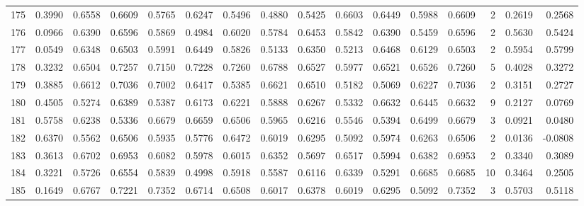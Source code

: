 \begin{tabular}{lrrrrrrrrrrrrrrr}
175 &      0.3990 &  0.6558 &  0.6609 &  0.5765 &  0.6247 &  0.5496 &  0.4880 &  0.5425 &  0.6603 &  0.6449 &   0.5988 &     0.6609 &      2 &                    0.2619 &                     0.2568 \\
176 &      0.0966 &  0.6390 &  0.6596 &  0.5869 &  0.4984 &  0.6020 &  0.5784 &  0.6453 &  0.5842 &  0.6390 &   0.5459 &     0.6596 &      2 &                    0.5630 &                     0.5424 \\
177 &      0.0549 &  0.6348 &  0.6503 &  0.5991 &  0.6449 &  0.5826 &  0.5133 &  0.6350 &  0.5213 &  0.6468 &   0.6129 &     0.6503 &      2 &                    0.5954 &                     0.5799 \\
178 &      0.3232 &  0.6504 &  0.7257 &  0.7150 &  0.7228 &  0.7260 &  0.6788 &  0.6527 &  0.5977 &  0.6521 &   0.6526 &     0.7260 &      5 &                    0.4028 &                     0.3272 \\
179 &      0.3885 &  0.6612 &  0.7036 &  0.7002 &  0.6417 &  0.5385 &  0.6621 &  0.6510 &  0.5182 &  0.5069 &   0.6227 &     0.7036 &      2 &                    0.3151 &                     0.2727 \\
180 &      0.4505 &  0.5274 &  0.6389 &  0.5387 &  0.6173 &  0.6221 &  0.5888 &  0.6267 &  0.5332 &  0.6632 &   0.6445 &     0.6632 &      9 &                    0.2127 &                     0.0769 \\
181 &      0.5758 &  0.6238 &  0.5336 &  0.6679 &  0.6659 &  0.6506 &  0.5965 &  0.6216 &  0.5546 &  0.5394 &   0.6499 &     0.6679 &      3 &                    0.0921 &                     0.0480 \\
182 &      0.6370 &  0.5562 &  0.6506 &  0.5935 &  0.5776 &  0.6472 &  0.6019 &  0.6295 &  0.5092 &  0.5974 &   0.6263 &     0.6506 &      2 &                    0.0136 &                    -0.0808 \\
183 &      0.3613 &  0.6702 &  0.6953 &  0.6082 &  0.5978 &  0.6015 &  0.6352 &  0.5697 &  0.6517 &  0.5994 &   0.6382 &     0.6953 &      2 &                    0.3340 &                     0.3089 \\
184 &      0.3221 &  0.5726 &  0.6554 &  0.5839 &  0.4998 &  0.5918 &  0.5587 &  0.6116 &  0.6339 &  0.5291 &   0.6685 &     0.6685 &     10 &                    0.3464 &                     0.2505 \\
185 &      0.1649 &  0.6767 &  0.7221 &  0.7352 &  0.6714 &  0.6508 &  0.6017 &  0.6378 &  0.6019 &  0.6295 &   0.5092 &     0.7352 &      3 &                    0.5703 &                     0.5118 \\

\end{tabular}
